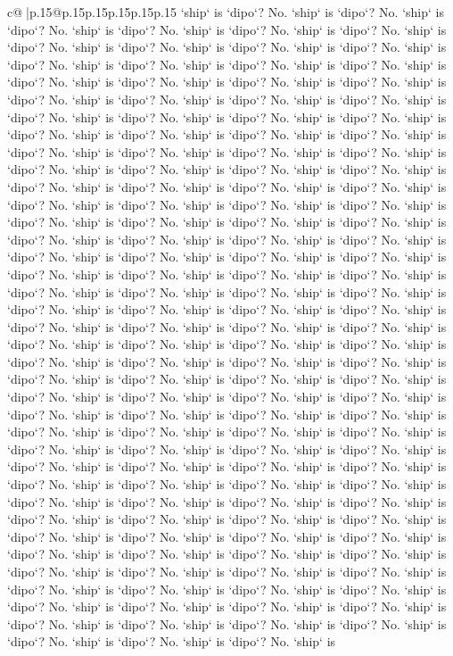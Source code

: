 \documentclass{article}
\begin{document}
{\begin{supertabular}{c@{$\;$}|p{.15\linewidth}@{}p{.15\linewidth}p{.15\linewidth}p{.15\linewidth}p{.15\linewidth}p{.15\linewidth}}
{{{`ship` is `dipo`? No. `ship` is `dipo`? No. `ship` is `dipo`? No. `ship` is `dipo`? No. `ship` is `dipo`? No. `ship` is `dipo`? No. `ship` is `dipo`? No. `ship` is `dipo`? No. `ship` is `dipo`? No. `ship` is `dipo`? No. `ship` is `dipo`? No. `ship` is `dipo`? No. `ship` is `dipo`? No. `ship` is `dipo`? No. `ship` is `dipo`? No. `ship` is `dipo`? No. `ship` is `dipo`? No. `ship` is `dipo`? No. `ship` is `dipo`? No. `ship` is `dipo`? No. `ship` is `dipo`? No. `ship` is `dipo`? No. `ship` is `dipo`? No. `ship` is `dipo`? No. `ship` is `dipo`? No. `ship` is `dipo`? No. `ship` is `dipo`? No. `ship` is `dipo`? No. `ship` is `dipo`? No. `ship` is `dipo`? No. `ship` is `dipo`? No. `ship` is `dipo`? No. `ship` is `dipo`? No. `ship` is `dipo`? No. `ship` is `dipo`? No. `ship` is `dipo`? No. `ship` is `dipo`? No. `ship` is `dipo`? No. `ship` is `dipo`? No. `ship` is `dipo`? No. `ship` is `dipo`? No. `ship` is `dipo`? No. `ship` is `dipo`? No. `ship` is `dipo`? No. `ship` is `dipo`? No. `ship` is `dipo`? No. `ship` is `dipo`? No. `ship` is `dipo`? No. `ship` is `dipo`? No. `ship` is `dipo`? No. `ship` is `dipo`? No. `ship` is `dipo`? No. `ship` is `dipo`? No. `ship` is `dipo`? No. `ship` is `dipo`? No. `ship` is `dipo`? No. `ship` is `dipo`? No. `ship` is `dipo`? No. `ship` is `dipo`? No. `ship` is `dipo`? No. `ship` is `dipo`? No. `ship` is `dipo`? No. `ship` is `dipo`? No. `ship` is `dipo`? No. `ship` is `dipo`? No. `ship` is `dipo`? No. `ship` is `dipo`? No. `ship` is `dipo`? No. `ship` is `dipo`? No. `ship` is `dipo`? No. `ship` is `dipo`? No. `ship` is `dipo`? No. `ship` is `dipo`? No. `ship` is `dipo`? No. `ship` is `dipo`? No. `ship` is `dipo`? No. `ship` is `dipo`? No. `ship` is `dipo`? No. `ship` is `dipo`? No. `ship` is `dipo`? No. `ship` is `dipo`? No. `ship` is `dipo`? No. `ship` is `dipo`? No. `ship` is `dipo`? No. `ship` is `dipo`? No. `ship` is `dipo`? No. `ship` is `dipo`? No. `ship` is `dipo`? No. `ship` is `dipo`? No. `ship` is `dipo`? No. `ship` is `dipo`? No. `ship` is `dipo`? No. `ship` is `dipo`? No. `ship` is `dipo`? No. `ship` is `dipo`? No. `ship` is `dipo`? No. `ship` is `dipo`? No. `ship` is `dipo`? No. `ship` is `dipo`? No. `ship` is `dipo`? No. `ship` is `dipo`? No. `ship` is `dipo`? No. `ship` is `dipo`? No. `ship` is `dipo`? No. `ship` is `dipo`? No. `ship` is `dipo`? No. `ship` is `dipo`? No. `ship` is `dipo`? No. `ship` is `dipo`? No. `ship` is `dipo`? No. `ship` is `dipo`? No. `ship` is `dipo`? No. `ship` is `dipo`? No. `ship` is `dipo`? No. `ship` is `dipo`? No. `ship` is `dipo`? No. `ship` is `dipo`? No. `ship` is `dipo`? No. `ship` is `dipo`? No. `ship` is `dipo`? No. `ship` is `dipo`? No. `ship` is `dipo`? No. `ship` is `dipo`? No. `ship` is `dipo`? No. `ship` is `dipo`? No. `ship` is `dipo`? No. `ship` is `dipo`? No. `ship` is `dipo`? No. `ship` is `dipo`? No. `ship` is `dipo`? No. `ship` is `dipo`? No. `ship` is `dipo`? No. `ship` is `dipo`? No. `ship` is `dipo`? No. `ship` is `dipo`? No. `ship` is `dipo`? No. `ship` is `dipo`? No. `ship` is `dipo`? No. `ship` is `dipo`? No. `ship` is `dipo`? No. `ship` is `dipo`? No. `ship` is `dipo`? No. `ship` is `dipo`? No. `ship` is `dipo`? No. `ship` is `dipo`? No. `ship` is }}}
\end{supertabular}}
\end{document}
